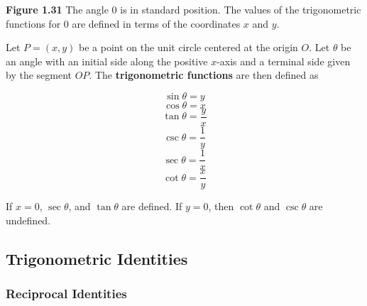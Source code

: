\documentclass{book}
\begin{document}

	\textbf{Figure 1.31} The angle \(0\) is in standard position. The values of the trigonometric functions for \(0\) are defined in terms of the coordinates \(x\) and \(y\).

	\newpage 
Let \(P=(x,y)\) be a point on the unit circle centered at the origin \(O\). Let \(\theta\) be an angle with an initial side along the positive \(x\)-axis and a terminal side given by the segment \(OP\). The \textbf{trigonometric functions} are then defined as 

\[\sin\theta=y\]
\[\cos\theta=x\]
\[\tan\theta=\frac{y}{x}\]
\[\csc\theta=\frac{1}{y}\]
\[\sec\theta=\frac{1}{x}\]
\[\cot\theta=\frac{x}{y}\]

If \(x=0\), \(\sec\theta\), and \(\tan\theta\) are defined. If \(y=0\), then \(\cot\theta\) and \(\csc \theta\) are undefined. 

\subsection{Trigonometric Identities} 
\subsubsection{Reciprocal Identities}
\end{document}
